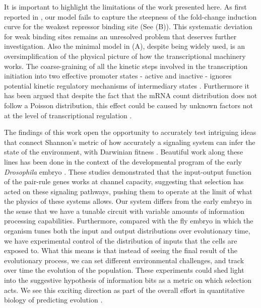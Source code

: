 It is important to highlight the limitations of the work presented here. As
first reported in \cite{Razo-Mejia2018}, our model fails to capture the
steepness of the fold-change induction curve for the weakest repressor binding
site (See (B)). This systematic deviation for weak binding
sites remains an unresolved problem that deserves further investigation. Also
the minimal model in (A), despite being widely used,
is an oversimplification of the physical picture of how the transcriptional
machinery works. The coarse-graining of all the kinetic steps involved in the
transcription initiation into two effective promoter states - active and
inactive - ignores potential kinetic regulatory mechanisms of intermediary
states \cite{Scholes2017}. Furthermore it has been argued that despite the fact
that the mRNA count distribution does not follow a Poisson distribution, this
effect could be caused by unknown factors not at the level of transcriptional
regulation \cite{Choubey2018}.

The findings of this work open the opportunity to accurately test intriguing
ideas that connect Shannon's metric of how accurately a signaling system can
infer the state of the environment, with Darwinian fitness \cite{Taylor2007}.
Beautiful work along these lines has been done in the context of the
developmental program of the early {\it Drosophila} embryo \cite{Tkacik2008,
Petkova2019}. These studies demonstrated that the input-output function of the
pair-rule genes works at channel capacity, suggesting that selection has
acted on these signaling pathways, pushing them to operate at the limit of what
the physics of these systems allows. Our system differs from the early embryo in
the sense that we have a tunable circuit with variable amounts of information
processing capabilities. Furthermore, compared with the fly embryo in which the
organism tunes both the input and output distributions over evolutionary time,
we have experimental control of the distribution of inputs that the cells are
exposed to. What this means is that instead of seeing the final result of the
evolutionary process, we can set different environmental challenges, and track
over time the evolution of the population. These experiments could shed light
into the suggestive hypothesis of information bits as a metric on which
selection acts. We see this exciting direction as part of the overall effort in
quantitative biology of predicting evolution \cite{Lassig2017}.
